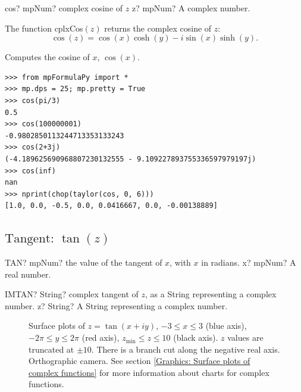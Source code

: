 \begin{mpFunctionsExtract}
	\mpFunctionOne
	{cos? mpNum? complex cosine of $z$}
	{z? mpNum? A complex number.}
\end{mpFunctionsExtract}

\vspace{0.3cm}
The function \textsf{cplxCos$(z)$} returns the complex cosine of $z$: 
\begin{equation}
	\cos(z) = \cos(x) \cosh(y) - i \sin(x) \sinh(y).
\end{equation}


Computes the cosine of $x$, $\cos(x)$.
\begin{lstlisting}
>>> from mpFormulaPy import *
>>> mp.dps = 25; mp.pretty = True
>>> cos(pi/3)
0.5
>>> cos(100000001)
-0.9802850113244713353133243
>>> cos(2+3j)
(-4.189625690968807230132555 - 9.109227893755336597979197j)
>>> cos(inf)
nan
>>> nprint(chop(taylor(cos, 0, 6)))
[1.0, 0.0, -0.5, 0.0, 0.0416667, 0.0, -0.00138889]
\end{lstlisting}




\newpage
\subsection{\texorpdfstring{$\text{Tangent: }\tan(z)$}{tan}}

\begin{mpFunctionsExtract}
	\mpWorksheetFunctionOneNotImplemented
	{TAN? mpNum? the value of the tangent of $x$, with $x$ in radians.}
	{x? mpNum? A real number.}
\end{mpFunctionsExtract}

\vspace{0.6cm}
\begin{mpFunctionsExtract}
	\mpWorksheetFunctionOneNotImplemented
	{IMTAN? String? complex tangent of $z$, as a String representing a complex number.}
	{z? String? A String representing a complex number.}
\end{mpFunctionsExtract}

\begin{figure}[ht]%
	\centering
	\qquad
	\caption[Complex Tangent]{Surface plots of $z = \tan(x + iy)$, $-3 \leq x \leq 3$ (blue axis), $-2 \pi \leq y \leq 2\pi$ (red axis), $z_{\text{min}} \leq z \leq 10$ (black axis). $z$ values are truncated at $\pm 10$. There is a branch cut along the negative real axis. Orthographic camera. See section \ref{Graphics: Surface plots of complex functions} for more information about charts for complex functions.} 
	\label{fig:Complex Tangent}%
\end{figure}


